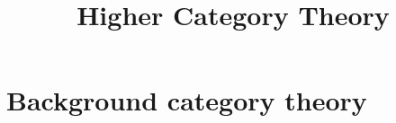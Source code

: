 \documentclass{article}
\title{Higher Category Theory}
\begin{document}
\maketitle

\section{Background category theory}

\end{document}
